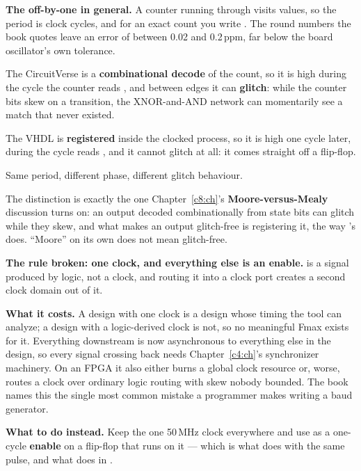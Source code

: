 \textbf{The off-by-one in general.} A counter running  through  visits
 values, so the period is  clock cycles, and for an exact
count you write . The round numbers the book quotes
leave an error of between 0.02 and 0.2\,ppm, far below the board oscillator's own tolerance.

The CircuitVerse  is a \textbf{combinational decode} of the count, so it is high
during the cycle the counter reads , and between edges it can \textbf{glitch}: while the
counter bits skew on a transition, the XNOR-and-AND network can momentarily see a match that never
existed.

The VHDL  is \textbf{registered} inside the clocked process, so it is high one cycle
later, during the cycle  reads , and it cannot glitch at all: it comes
straight off a flip-flop.

Same period, different phase, different glitch behaviour. 

The distinction is exactly the one Chapter~\ref{c8:ch}'s \textbf{Moore-versus-Mealy} discussion
turns on: an output decoded combinationally from state bits can glitch while they skew, and what
makes an output glitch-free is registering it, the way 's  does.
``Moore'' on its own does not mean glitch-free. 

\textbf{The rule broken: one clock, and everything else is an enable.}  is a signal
produced by logic, not a clock, and routing it into a clock port creates a second clock domain out
of it. 

\textbf{What it costs.} A design with one clock is a design whose timing the tool can analyze; a
design with a logic-derived clock is not, so no meaningful Fmax exists for it. Everything downstream
is now asynchronous to everything else in the design, so every signal crossing back needs
Chapter~\ref{c4:ch}'s synchronizer machinery. On an FPGA it also either burns a global clock
resource or, worse, routes a clock over ordinary logic routing with skew nobody bounded. The book
names this the single most common mistake a programmer makes writing a baud generator.

\textbf{What to do instead.} Keep the one 50\,MHz clock everywhere and use  as a
one-cycle \textbf{enable} on a flip-flop that runs on it --- which is what  does
with the same pulse, and what  does in . 

